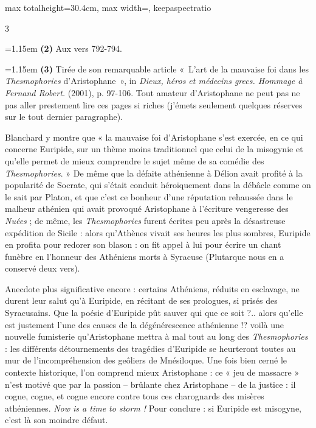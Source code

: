 \documentclass[11pt,twoside]{book}
\newcommand{\italique}[1]{\textit{#1}}
\newcommand{\anglais}[1]{\textit{#1}}
\begin{document}
\begin{adjustbox}{max totalheight=30.4cm, max width=\textwidth, keepaspectratio}
\begin{minipage}{\textwidth}
{\begin{multicols}{3}
\par\vspace{1.5pt}
\noindent\hangindent=1.15em {\color{sepiaNote}\textbf{(2)}} Aux vers 792-794.
\par\vspace{1.5pt}
\noindent\hangindent=1.15em {\color{sepiaNote}\textbf{(3)}} Tirée de son remarquable article «~L'art de la mauvaise foi dans les \italique{Thesmophories} d'Aristophane~», in \italique{Dieux, héros et médecins grecs. Hommage à Fernand Robert.} (2001), p. 97-106. Tout amateur d'Aristophane ne peut pas ne pas aller prestement lire ces pages si riches (j'émets seulement quelques réserves sur le tout dernier paragraphe).
\par\vspace{1.5pt}
\noindent Blanchard y montre que « la mauvaise foi d'Aristophane s'est exercée, en ce qui concerne Euripide, sur un thème moins traditionnel que celui de la misogynie et qu'elle permet de mieux comprendre le sujet même de sa comédie des \italique{Thesmophories}. » De même que la défaite athénienne à Délion avait profité à la popularité de Socrate, qui s'était conduit héroïquement dans la débâcle comme on le sait par Platon, et que c'est ce bonheur d'une réputation rehaussée dans le malheur athénien qui avait provoqué Aristophane à l'écriture vengeresse des \italique{Nuées} ; de même, les \italique{Thesmophories} furent écrites peu après la désastreuse expédition de Sicile : alors qu'Athènes vivait ses heures les plus sombres, Euripide en profita pour redorer son blason : on fit appel à lui pour écrire un chant funèbre en l'honneur des Athéniens morts à Syracuse (Plutarque nous en a conservé deux vers).
\par\vspace{1.5pt}
\noindent Anecdote plus significative encore : certains Athéniens, réduits en esclavage, ne durent leur salut qu'à Euripide, en récitant de ses prologues, si prisés des Syracusains. Que la poésie d'Euripide pût sauver qui que ce soit ?.. alors qu'elle est justement l'une des causes de la dégénérescence athénienne !? voilà une nouvelle fumisterie qu'Aristophane mettra à mal tout au long des \italique{Thesmophories} : les différents détournements des tragédies d'Euripide se heurteront toutes au mur de l'incompréhension des geôliers de Mnésiloque. Une fois bien cerné le contexte historique, l'on comprend mieux Aristophane : ce « jeu de massacre » n'est motivé que par la passion -- brûlante chez Aristophane -- de la justice : il cogne, cogne, et cogne encore contre tous ces charognards des misères athéniennes. \anglais{Now is a time to storm !} Pour conclure : si Euripide est misogyne, c'est là son moindre défaut.

\end{multicols}}
\end{minipage}
\end{adjustbox}
\end{document}
